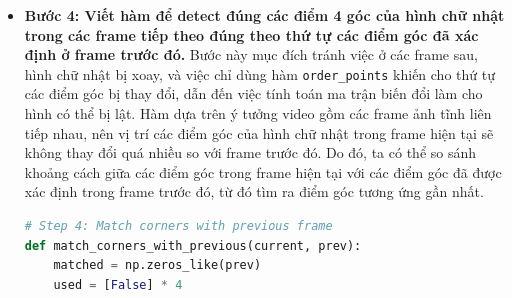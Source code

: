 \begin{itemize}
\begin{lstlisting}[language=Python]
    diff = np.diff(pts, axis=1)
    rect[1] = pts[np.argmin(diff)]  # TR
    rect[3] = pts[np.argmax(diff)]  # BL

    return rect
               \end{lstlisting}
               \hspace*{0.6cm}Thuật toán xác định vị trí các điểm góc của hình chữ nhật dựa trên tổng và hiệu của tọa độ pixel x, y của các điểm nằm trên contours. Cụ thể:
               \begin{itemize}[label={--}]
                    \item Điểm có tổng tọa độ ($x + y$) nhỏ nhất được xác định là góc trên bên trái (TL)
                    \item Điểm có tổng tọa độ ($x + y$) lớn nhất được xác định là góc dưới bên phải (BR)
                    \item Điểm có hiệu tọa độ ($y - x$) nhỏ nhất được xác định là góc trên bên phải (TR)
                    \item Điểm có hiệu tọa độ ($y - x$) lớn nhất được xác định là góc dưới bên trái (BL)
               \end{itemize}
               \hspace*{0.6cm}Bước sắp xếp 4 điểm góc theo thứ tự này được thực hiện chỉ với frame đầu tiên, khi nhận xét trong video thấy rằng hình chữ nhật ban đầu nằm ngang, vậy nên thuật toán sẽ không bị nhầm lẫn trong việc xác định vị trí các điểm góc. 
               \item \textbf{Bước 4: Viết hàm để detect đúng các điểm 4 góc của hình chữ nhật trong các frame tiếp theo đúng theo thứ tự các điểm góc đã xác định ở frame trước đó.}
               \newline
               \hspace*{0.6cm}Bước này mục đích tránh việc ở các frame sau, hình chữ nhật bị xoay, và việc chỉ dùng hàm \texttt{order\_points} khiến cho thứ tự các điểm góc bị thay đổi, dẫn đến việc tính toán ma trận biến đổi làm cho hình có thể bị lật. Hàm dựa trên ý tưởng video gồm các frame ảnh tĩnh liên tiếp nhau, nên vị trí các điểm góc của hình chữ nhật trong frame hiện tại sẽ không thay đổi quá nhiều so với frame trước đó. Do đó, ta có thể so sánh khoảng cách giữa các điểm góc trong frame hiện tại với các điểm góc đã được xác định trong frame trước đó, từ đó tìm ra điểm góc tương ứng gần nhất.
               \begin{lstlisting}[language=Python]
# Step 4: Match corners with previous frame
def match_corners_with_previous(current, prev):
    matched = np.zeros_like(prev)
    used = [False] * 4


\end{lstlisting}
\end{itemize}

